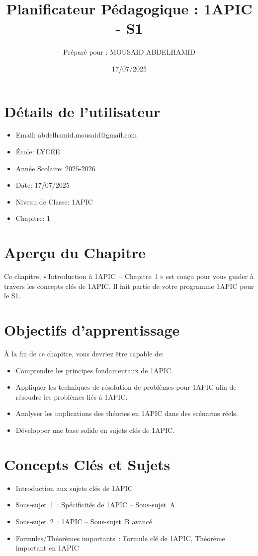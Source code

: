 \documentclass{article}
\title{Planificateur Pédagogique : 1APIC - S1}
\author{Préparé pour : MOUSAID ABDELHAMID}
\date{17/07/2025}
\begin{document}
	
	\maketitle
	
	\section*{Détails de l'utilisateur}
	\begin{itemize}
		\item Email: abdelhamid.mousaid@gmail.com
		\item École: LYCEE
		\item Année Scolaire: 2025-2026
		\item Date: 17/07/2025
		\item Niveau de Classe: 1APIC
		\item Chapitre: 1
	\end{itemize}
	
	\section*{Aperçu du Chapitre}
	Ce chapitre, « Introduction à 1APIC – Chapitre 1 »  
	est conçu pour vous guider à travers les concepts clés de 1APIC.  
	Il fait partie de votre programme 1APIC pour le S1.
	
	\section*{Objectifs d'apprentissage}
	À la fin de ce chapitre, vous devriez être capable de:
	\begin{itemize}
		\item Comprendre les principes fondamentaux de 1APIC.
		\item Appliquer les techniques de résolution de problèmes pour 1APIC afin de résoudre les problèmes liés à 1APIC.
		\item Analyser les implications des théories en 1APIC dans des scénarios réels.
		\item Développer une base solide en sujets clés de 1APIC.
	\end{itemize}
	
	\section*{Concepts Clés et Sujets}
	\begin{itemize}
		\item Introduction aux sujets clés de 1APIC
		\item Sous-sujet 1 : Spécificités de 1APIC – Sous-sujet A
		\item Sous-sujet 2 : 1APIC – Sous-sujet B avancé
		\item Formules/Théorèmes importants : Formule clé de 1APIC, Théorème important en 1APIC
	\end{itemize}
	
\end{document}
